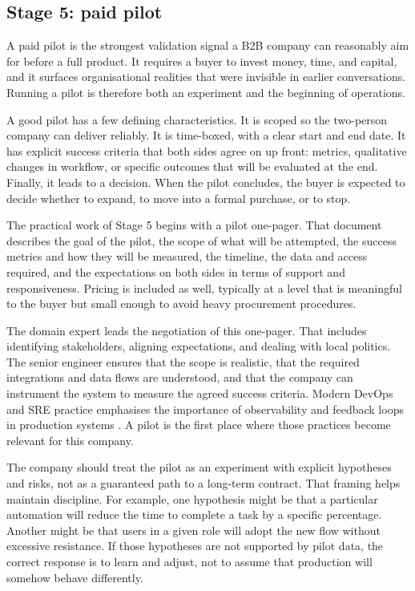 \documentclass[10pt, a4paper, twocolumn]{article} %
\begin{document}
\subsection{Stage 5: paid pilot}

A paid pilot is the strongest validation signal a B2B company can reasonably aim for before a full product. It requires a buyer to invest money, time, and capital, and it surfaces organisational realities that were invisible in earlier conversations. Running a pilot is therefore both an experiment and the beginning of operations.

A good pilot has a few defining characteristics. It is scoped so the two-person company can deliver reliably. It is time-boxed, with a clear start and end date. It has explicit success criteria that both sides agree on up front: metrics, qualitative changes in workflow, or specific outcomes that will be evaluated at the end. Finally, it leads to a decision. When the pilot concludes, the buyer is expected to decide whether to expand, to move into a formal purchase, or to stop.

The practical work of Stage 5 begins with a pilot one-pager. That document describes the goal of the pilot, the scope of what will be attempted, the success metrics and how they will be measured, the timeline, the data and access required, and the expectations on both sides in terms of support and responsiveness. Pricing is included as well, typically at a level that is meaningful to the buyer but small enough to avoid heavy procurement procedures.

The domain expert leads the negotiation of this one-pager. That includes identifying stakeholders, aligning expectations, and dealing with local politics. The senior engineer ensures that the scope is realistic, that the required integrations and data flows are understood, and that the company can instrument the system to measure the agreed success criteria. Modern DevOps and SRE practice emphasises the importance of observability and feedback loops in production systems \citep{forsgren2018accelerate}. A pilot is the first place where those practices become relevant for this company.

The company should treat the pilot as an experiment with explicit hypotheses and risks, not as a guaranteed path to a long-term contract. That framing helps maintain discipline. For example, one hypothesis might be that a particular automation will reduce the time to complete a task by a specific percentage. Another might be that users in a given role will adopt the new flow without excessive resistance. If those hypotheses are not supported by pilot data, the correct response is to learn and adjust, not to assume that production will somehow behave differently.
\end{document}
